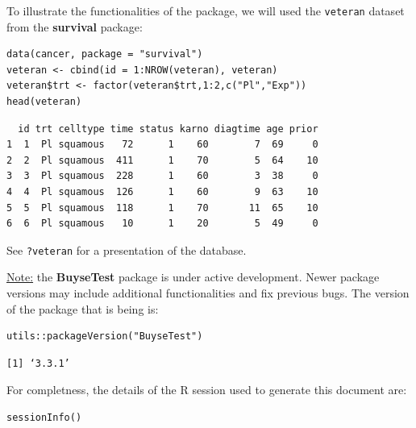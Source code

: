 \documentclass[12pt]{article}
\begin{document}
To illustrate the functionalities of the package, we will used the
\texttt{veteran} dataset from the \textbf{survival} package:
\lstset{language=r,label= ,caption= ,captionpos=b,numbers=none}
\begin{lstlisting}
data(cancer, package = "survival")
veteran <- cbind(id = 1:NROW(veteran), veteran)
veteran$trt <- factor(veteran$trt,1:2,c("Pl","Exp"))
head(veteran)
\end{lstlisting}

\begin{verbatim}
  id trt celltype time status karno diagtime age prior
1  1  Pl squamous   72      1    60        7  69     0
2  2  Pl squamous  411      1    70        5  64    10
3  3  Pl squamous  228      1    60        3  38     0
4  4  Pl squamous  126      1    60        9  63    10
5  5  Pl squamous  118      1    70       11  65    10
6  6  Pl squamous   10      1    20        5  49     0
\end{verbatim}


See \texttt{?veteran} for a presentation of the database.

\bigskip

\uline{Note:} the \textbf{BuyseTest} package is under active development. Newer
package versions may include additional functionalities and fix
previous bugs. The version of the package that is being is:
\lstset{language=r,label= ,caption= ,captionpos=b,numbers=none}
\begin{lstlisting}
utils::packageVersion("BuyseTest")
\end{lstlisting}

\begin{verbatim}
[1] ‘3.3.1’
\end{verbatim}


For completness, the details of the R session used to generate this
document are:
\lstset{language=r,label= ,caption= ,captionpos=b,numbers=none}
\begin{lstlisting}
sessionInfo()
\end{lstlisting}
\end{document}
